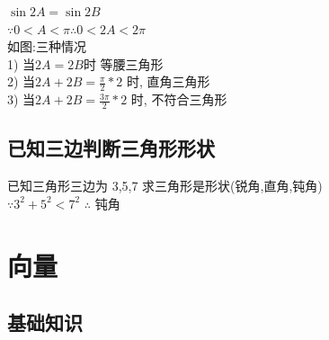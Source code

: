 \documentclass[hyperref, UTF8,11pt,a4paper]{ctexart} %
\begin{document}
{\color{red} $ \sin 2A= \sin 2B$ } \\

$\because 0<A<\pi \therefore 0<2A<2\pi$ \\
如图:三种情况 \\
1) 当$ 2A=2B $时 等腰三角形 \\
2) 当$ 2A+2B= \frac{\pi}{2} * 2 $ 时, 直角三角形 \\
3) 当$ 2A+2B= \frac{3\pi}{2} * 2 $ 时, 不符合三角形 \\




\subsection{已知三边判断三角形形状}
{\color{red} 已知三角形三边为 3,5,7 求三角形是形状(锐角,直角,钝角) } \\
$\because 3^{2}+5^{2}<7^{2}$ $\therefore$ 钝角


\newpage
\section{向量}
\subsection{基础知识}
\end{document}
